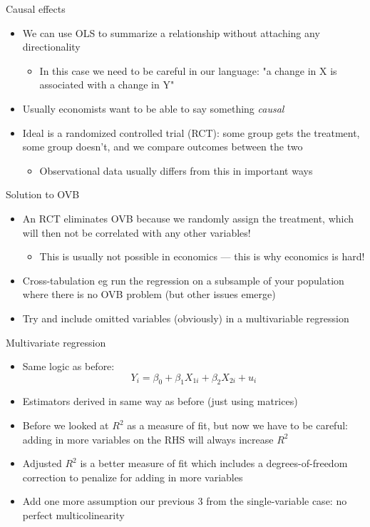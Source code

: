 \documentclass[aspectratio=169]{beamer}
\begin{document}
\begin{frame}{Causal effects}
    \begin{itemize}
        \item We can use OLS to summarize a relationship without attaching any directionality
        \begin{itemize}
            \item In this case we need to be careful in our language: "a change in X is associated with a change in Y"
        \end{itemize}
        \item Usually economists want to be able to say something \textit{causal}
        \item Ideal is a randomized controlled trial (RCT): some group gets the treatment, some group doesn't, and we compare outcomes between the two
        \begin{itemize}
            \item Observational data usually differs from this in important ways
        \end{itemize}
    \end{itemize}
\end{frame}

\begin{frame}{Solution to OVB}
    \begin{itemize}
        \item An RCT eliminates OVB because we randomly assign the treatment, which will then not be correlated with any other variables!
        \begin{itemize}
            \item This is usually not possible in economics --- this is why economics is hard!
        \end{itemize}
        \item Cross-tabulation eg run the regression on a subsample of your population where there is no OVB problem (but other issues emerge)
        \item Try and include omitted variables (obviously) in a multivariable regression
    \end{itemize}
\end{frame}

\begin{frame}{Multivariate regression}
    \begin{itemize}
        \item Same logic as before:
        $$
        Y_i = \beta_0 + \beta_1X_{1i} + \beta_2X_{2i} + u_i    
        $$
        \item Estimators derived in same way as before (just using matrices)
        \item Before we looked at $R^2$ as a measure of fit, but now we have to be careful: adding in more variables on the RHS will always increase $R^2$
        \item Adjusted $R^2$ is a better measure of fit which includes a degrees-of-freedom correction to penalize for adding in more variables
        \item Add one more assumption our previous 3 from the single-variable case: no perfect multicolinearity
    \end{itemize}
\end{frame}
\end{document}
